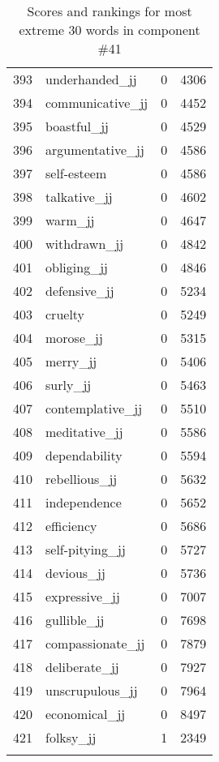 \begin{longtable}[!htbp]{| rlr@{.}l |}
    393 & underhanded\_jj & 0 & 4306 \\
    394 & communicative\_jj & 0 & 4452 \\
    395 & boastful\_jj & 0 & 4529 \\
    396 & argumentative\_jj & 0 & 4586 \\
    397 & self-esteem & 0 & 4586 \\
    398 & talkative\_jj & 0 & 4602 \\
    399 & warm\_jj & 0 & 4647 \\
    400 & withdrawn\_jj & 0 & 4842 \\
    401 & obliging\_jj & 0 & 4846 \\
    402 & defensive\_jj & 0 & 5234 \\
    403 & cruelty & 0 & 5249 \\
    404 & morose\_jj & 0 & 5315 \\
    405 & merry\_jj & 0 & 5406 \\
    406 & surly\_jj & 0 & 5463 \\
    407 & contemplative\_jj & 0 & 5510 \\
    408 & meditative\_jj & 0 & 5586 \\
    409 & dependability & 0 & 5594 \\
    410 & rebellious\_jj & 0 & 5632 \\
    411 & independence & 0 & 5652 \\
    412 & efficiency & 0 & 5686 \\
    413 & self-pitying\_jj & 0 & 5727 \\
    414 & devious\_jj & 0 & 5736 \\
    415 & expressive\_jj & 0 & 7007 \\
    416 & gullible\_jj & 0 & 7698 \\
    417 & compassionate\_jj & 0 & 7879 \\
    418 & deliberate\_jj & 0 & 7927 \\
    419 & unscrupulous\_jj & 0 & 7964 \\
    420 & economical\_jj & 0 & 8497 \\
    421 & folksy\_jj & 1 & 2349 \\
    \hline
    \caption{Scores and rankings for most extreme 30 words in component \#41} \\
\end{longtable}
